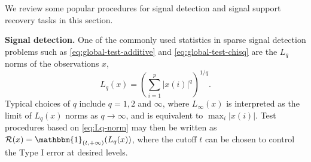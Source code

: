 
We review some popular procedures for signal detection and signal support recovery tasks in this section.

{\bf Signal detection.}
One of the commonly used statistics in sparse signal detection problems such as \eqref{eq:global-test-additive} and \eqref{eq:global-test-chisq} are the $L_q$ norms of the observations $x$,
\begin{equation} \label{eq:Lq-norm}
   L_q(x) = \left(\sum_{i=1}^p{|x(i)|^q}\right)^{1/q}.
\end{equation}
Typical choices of $q$ include $q=1, 2$ and $\infty$, where $L_\infty(x)$ is interpreted as the limit of $L_q(x)$ norms as $q\to\infty$, and is equivalent to $\max_{i}|x(i)|$.
Test procedures based on \eqref{eq:Lq-norm} may then be written as $\mathcal{R}(x) = \mathbbm{1}_{(t,+\infty)}(L_q(x))$, where the cutoff $t$ can be chosen to control the Type I error at desired levels.

